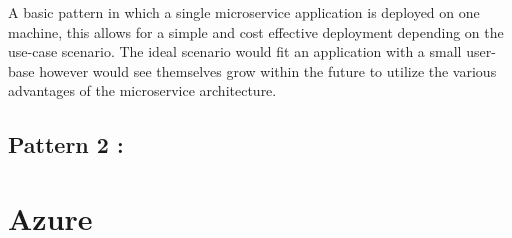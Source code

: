 A basic pattern in which a single microservice application is deployed on one machine, this allows for a simple and cost effective deployment depending on the use-case scenario. The ideal scenario would fit an application with a small user-base however would see themselves grow within the future to utilize the various advantages of the microservice architecture. 

\subsection{Pattern 2 : }

\section{Azure}

